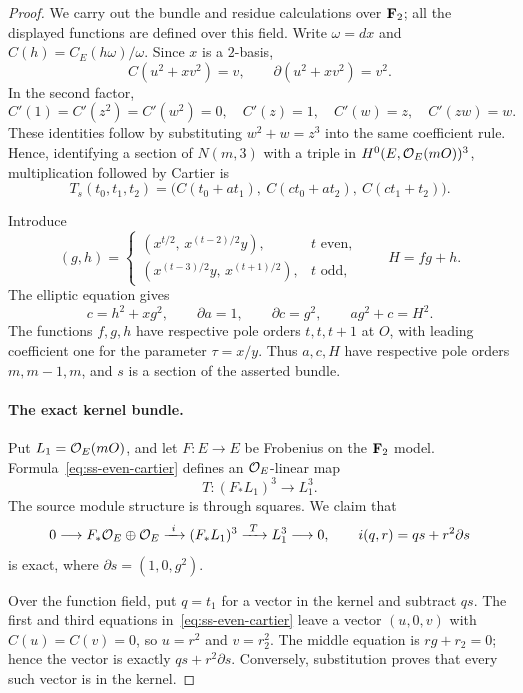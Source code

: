 \begin{proof}
We carry out the bundle and residue calculations over $\mathbf F_2$; all the displayed functions are defined over this field. Write $\omega=dx$ and $C(h)=C_E(h\omega)/\omega$. Since $x$ is a $2$-basis,
\[
 C(u^2+xv^2)=v,\qquad
 \partial(u^2+xv^2)=v^2.
\]
In the second factor,
\[
 C'(1)=C'(z^2)=C'(w^2)=0,\quad
 C'(z)=1,\quad C'(w)=z,\quad C'(zw)=w.
\]
These identities follow by substituting $w^2+w=z^3$ into the same coefficient rule. Hence, identifying a section of $N(m,3)$ with a triple in $H^0(E,\mathcal O_E(mO))^3$, multiplication followed by Cartier is
\begin{equation}\label{eq:ss-even-cartier}
 T_s(t_0,t_1,t_2)=
 \bigl(C(t_0+at_1),\ C(ct_0+at_2),\ C(ct_1+t_2)\bigr).
\end{equation}

Introduce
\[
 (g,h)=
 \begin{cases}
 (x^{t/2},\,x^{(t-2)/2}y),&t\text{ even},\\
 (x^{(t-3)/2}y,\,x^{(t+1)/2}),&t\text{ odd},
 \end{cases}
 \qquad H=fg+h.
\]
The elliptic equation gives
\begin{equation}\label{eq:ss-even-identities}
 c=h^2+xg^2,\qquad \partial a=1,\qquad
 \partial c=g^2,\qquad ag^2+c=H^2.
\end{equation}
The functions $f,g,h$ have respective pole orders $t,t,t+1$ at $O$, with leading coefficient one for the parameter $\tau=x/y$. Thus $a,c,H$ have respective pole orders $m,m-1,m$, and $s$ is a section of the asserted bundle.

\paragraph{The exact kernel bundle.}
Put $L_1=\mathcal O_E(mO)$, and let $F:E\to E$ be Frobenius on the $\mathbf F_2$ model. Formula~\eqref{eq:ss-even-cartier} defines an $\mathcal O_E$-linear map
\[
                   T:(F_*L_1)^3\longrightarrow L_1^3.
\]
The source module structure is through squares. We claim that
\begin{equation}\label{eq:ss-even-kernel}
 0\longrightarrow F_*\mathcal O_E\oplus\mathcal O_E
 \xrightarrow{\ i\ }(F_*L_1)^3
 \xrightarrow{\ T\ }L_1^3\longrightarrow0,
 \qquad i(q,r)=qs+r^2\partial s
\end{equation}
is exact, where $\partial s=(1,0,g^2)$.

Over the function field, put $q=t_1$ for a vector in the kernel and subtract $qs$. The first and third equations in~\eqref{eq:ss-even-cartier} leave a vector $(u,0,v)$ with $C(u)=C(v)=0$, so $u=r^2$ and $v=r_2^2$. The middle equation is $rg+r_2=0$; hence the vector is exactly $qs+r^2\partial s$. Conversely, substitution proves that every such vector is in the kernel.


\end{proof}

